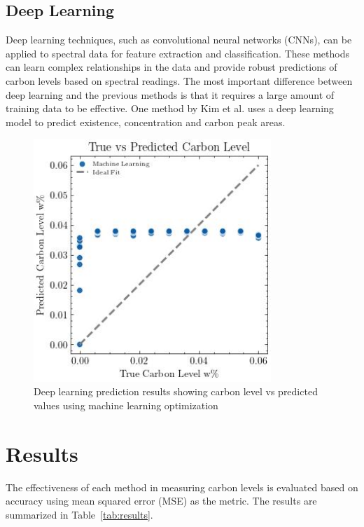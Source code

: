 \documentclass[review]{elsarticle}
\begin{document}
\subsection{Deep Learning}

Deep learning techniques, such as convolutional neural networks (CNNs), can be applied to spectral data for feature extraction and classification. These methods can learn complex relationships in the data and provide robust predictions of carbon levels based on spectral readings. The most important difference between deep learning and the previous methods is that it requires a large amount of training data to be effective. One method by Kim et al. \cite{kim_deep_2025} uses a deep learning model to predict existence, concentration and carbon peak areas.

\begin{figure}[H]
\centering
\includegraphics[width=0.8\textwidth]{../Figures/Analysis/carbon_level_vs_predicted_ml_optimization.jpg}
\caption{Deep learning prediction results showing carbon level vs predicted values using machine learning optimization}
\label{fig:ml_predictions}
\end{figure}

\section{Results}

The effectiveness of each method in measuring carbon levels is evaluated based on accuracy using mean squared error (MSE) as the metric. The results are summarized in Table~\ref{tab:results}.
\end{document}
